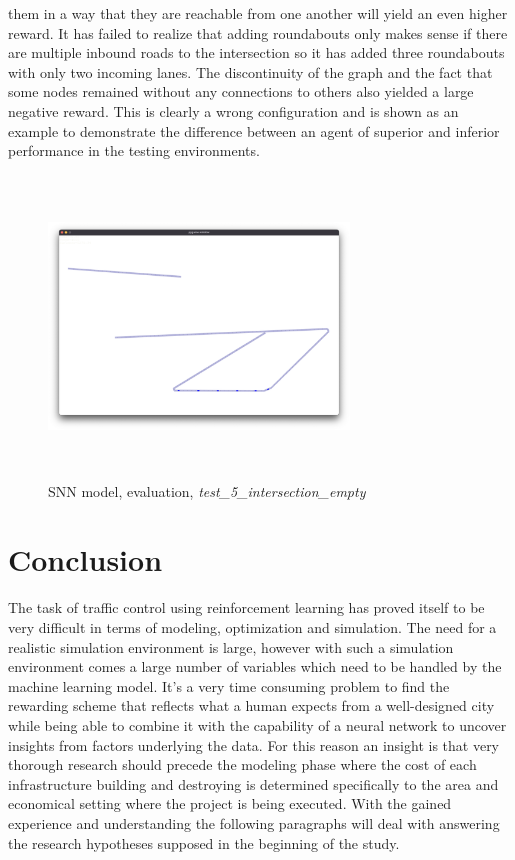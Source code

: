 \documentclass[
]{elteikthesis}[2023/04/10]
\begin{document}
\begin{enumerate}
them in a way that they are reachable from one another will yield
an even higher reward. It has failed to realize that adding roundabouts
only makes sense if there are multiple inbound roads to the intersection
so it has added three roundabouts with only two incoming lanes. The
discontinuity of the graph and the fact that some nodes remained without
any connections to others also yielded a large negative reward.
This is clearly a wrong configuration and is shown as an example to
demonstrate the difference between an agent of superior and inferior
performance in the testing environments. 
\begin{figure}[H]
\begin{centering}
\includegraphics[width=8cm,height=8cm,keepaspectratio]{images/city_agent_snn_2023-05-04_20-30_test_5_intersection_empty}
\par\end{centering}
\caption{SNN model, evaluation, \emph{test\_5\_intersection\_empty}}
\end{figure}
\end{enumerate}
\newpage{}

\chapter{Conclusion}

The task of traffic control using reinforcement learning has proved
itself to be very difficult in terms of modeling, optimization and
simulation. The need for a realistic simulation environment is large,
however with such a simulation environment comes a large number
of variables which need to be handled by the machine learning model.
It's a very time consuming problem to find the rewarding scheme that
reflects what a human expects from a well-designed city while being
able to combine it with the capability of a neural network to uncover
insights from factors underlying the data. For this reason an insight is that 
very thorough research should precede the modeling phase where the cost of
each infrastructure building and destroying is determined specifically to 
the area and economical setting where the project is being executed. 
With the gained experience and understanding the following paragraphs 
will deal with answering the research hypotheses supposed in the beginning of the study. 
\end{document}
